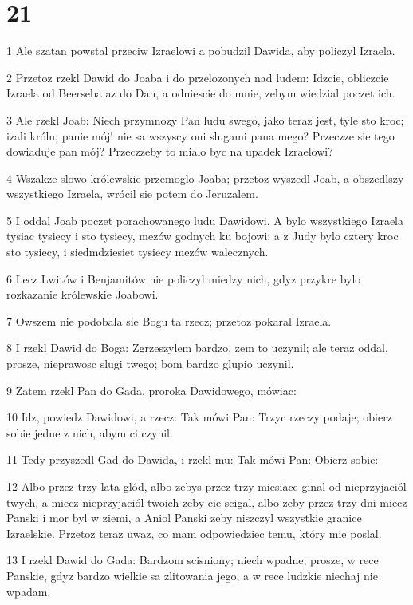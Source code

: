 \chapter{21}

\par 1 Ale szatan powstal przeciw Izraelowi a pobudzil Dawida, aby policzyl Izraela.
\par 2 Przetoz rzekl Dawid do Joaba i do przelozonych nad ludem: Idzcie, obliczcie Izraela od Beerseba az do Dan, a odniescie do mnie, zebym wiedzial poczet ich.
\par 3 Ale rzekl Joab: Niech przymnozy Pan ludu swego, jako teraz jest, tyle sto kroc; izali królu, panie mój! nie sa wszyscy oni slugami pana mego? Przeczze sie tego dowiaduje pan mój? Przeczzeby to mialo byc na upadek Izraelowi?
\par 4 Wszakze slowo królewskie przemoglo Joaba; przetoz wyszedl Joab, a obszedlszy wszystkiego Izraela, wrócil sie potem do Jeruzalem.
\par 5 I oddal Joab poczet porachowanego ludu Dawidowi. A bylo wszystkiego Izraela tysiac tysiecy i sto tysiecy, mezów godnych ku bojowi; a z Judy bylo cztery kroc sto tysiecy, i siedmdziesiet tysiecy mezów walecznych.
\par 6 Lecz Lwitów i Benjamitów nie policzyl miedzy nich, gdyz przykre bylo rozkazanie królewskie Joabowi.
\par 7 Owszem nie podobala sie Bogu ta rzecz; przetoz pokaral Izraela.
\par 8 I rzekl Dawid do Boga: Zgrzeszylem bardzo, zem to uczynil; ale teraz oddal, prosze, nieprawosc slugi twego; bom bardzo glupio uczynil.
\par 9 Zatem rzekl Pan do Gada, proroka Dawidowego, mówiac:
\par 10 Idz, powiedz Dawidowi, a rzecz: Tak mówi Pan: Trzyc rzeczy podaje; obierz sobie jedne z nich, abym ci czynil.
\par 11 Tedy przyszedl Gad do Dawida, i rzekl mu: Tak mówi Pan: Obierz sobie:
\par 12 Albo przez trzy lata glód, albo zebys przez trzy miesiace ginal od nieprzyjaciól twych, a miecz nieprzyjaciól twoich zeby cie scigal, albo zeby przez trzy dni miecz Panski i mor byl w ziemi, a Aniol Panski zeby niszczyl wszystkie granice Izraelskie. Przetoz teraz uwaz, co mam odpowiedziec temu, który mie poslal.
\par 13 I rzekl Dawid do Gada: Bardzom scisniony; niech wpadne, prosze, w rece Panskie, gdyz bardzo wielkie sa zlitowania jego, a w rece ludzkie niechaj nie wpadam.
